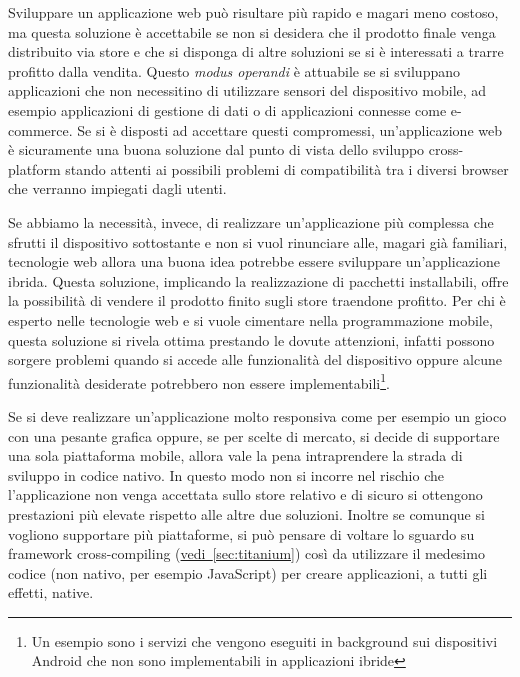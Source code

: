 		Sviluppare un applicazione web può risultare più rapido e magari meno 
		costoso, ma questa soluzione è accettabile se non si desidera che il 
		prodotto finale venga distribuito via store e che si disponga di 
		altre soluzioni se si è interessati a trarre profitto dalla vendita.
		Questo \textit{modus operandi} è attuabile se si sviluppano applicazioni
		che non necessitino di utilizzare sensori del dispositivo mobile, ad
		esempio applicazioni di gestione di dati o di applicazioni connesse 
		come e-commerce. Se si è disposti ad accettare questi compromessi,
		un'applicazione web è sicuramente una buona soluzione dal punto di vista 
		dello sviluppo cross-platform stando attenti ai possibili problemi di 
		compatibilità tra i diversi browser che verranno impiegati dagli utenti.
		
		Se abbiamo la necessità, invece, di realizzare un'applicazione più
		complessa che sfrutti il dispositivo sottostante e non si vuol
		rinunciare alle, magari già familiari, tecnologie web allora una buona
		idea potrebbe essere sviluppare	un'applicazione ibrida. Questa
		soluzione, implicando la realizzazione di pacchetti installabili, offre
		la possibilità di vendere il prodotto finito sugli store traendone
		profitto. Per chi è esperto nelle tecnologie web e si vuole cimentare
		nella programmazione mobile, questa soluzione si rivela ottima prestando
		le dovute attenzioni, infatti possono sorgere problemi quando si accede
		alle funzionalità del dispositivo oppure alcune funzionalità desiderate
		potrebbero non essere implementabili\footnote{Un esempio sono i servizi
		che vengono eseguiti in background sui dispositivi Android che non sono
		implementabili in applicazioni ibride}.
		
		Se si deve realizzare un'applicazione molto responsiva come per esempio 
		un gioco con una pesante grafica oppure, se per scelte di mercato, si
		decide di supportare una sola piattaforma mobile, allora vale la pena
		intraprendere la strada di sviluppo in codice nativo. In questo modo non
		si incorre nel rischio che l'applicazione non venga accettata sullo
		store relativo e di sicuro si ottengono prestazioni più elevate rispetto
		alle altre due soluzioni. Inoltre se comunque si vogliono supportare più
		piattaforme, si può pensare di voltare lo sguardo su framework
		cross-compiling (\hyperref[sec:titanium]{vedi~\ref{sec:titanium}}) così
		da utilizzare il medesimo codice (non nativo, per esempio JavaScript)
		per creare applicazioni, a tutti gli effetti, native.

